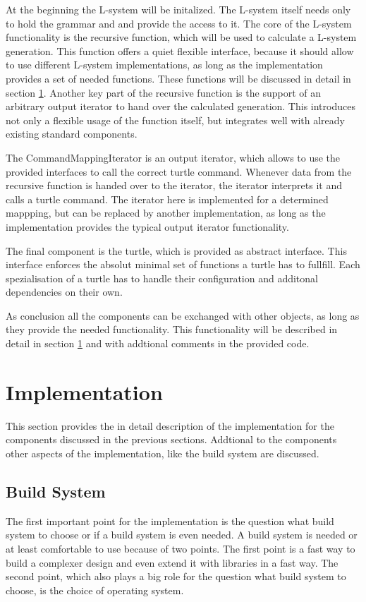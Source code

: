 \documentclass[english]{cpp-hmwk}
\begin{document}
At the beginning the L-system will be initalized. The L-system itself needs only to hold the grammar and and provide the access to it. The core of the L-system functionality is the recursive function, which will be used to calculate a L-system generation. This function offers a quiet flexible interface, because it should allow to use different L-system implementations, as long as the implementation provides a set of needed functions. These functions will be discussed in detail in section \ref{section:impl}. 
Another key part of the recursive function is the support of an arbitrary output iterator to hand over the calculated generation. This introduces not only a flexible usage of the function itself, but integrates well with already existing standard components. 

The CommandMappingIterator is an output iterator, which allows to use the provided interfaces to call the correct turtle command. Whenever data from the recursive function is handed over  to the iterator, the iterator interprets it and calls a turtle command. The iterator here is  implemented for a determined mappping, but can be replaced by another implementation, as long as the implementation provides the typical output iterator functionality.

The final component is the turtle, which is provided as abstract interface. This interface enforces the absolut minimal set of functions a turtle has to fullfill. Each spezialisation of a turtle has to handle their configuration and additonal dependencies on their own.

As conclusion all the components can be exchanged with other objects, as long as they provide the needed functionality. This functionality will be described in detail in section \ref{section:impl} and with addtional comments in the provided code.

\clearpage

\section{Implementation}
\label{section:impl}
This section provides the in detail description of the implementation for the components discussed in the previous sections. Addtional to the components other aspects of the implementation, like the build system are discussed.

\subsection{Build System}
\label{section:buildsystem}
The first important point for the implementation is the question what build system to choose or if a build system is even needed. A build system is needed or at least comfortable to use  because of two points. The first point is a fast way to build a complexer design and even extend it with libraries in a fast way. The second point, which also plays a big role for the question what build system to choose, is the choice of operating system.
 
\end{document}
